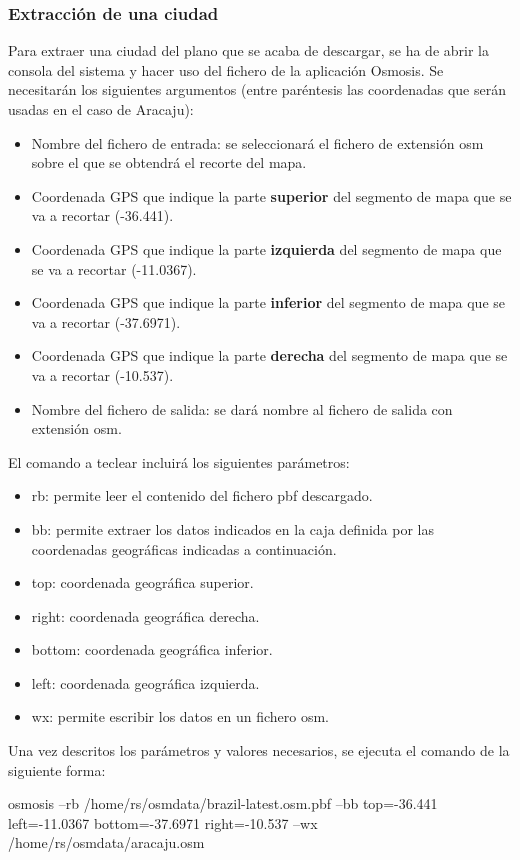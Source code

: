 \subsubsection{Extracción de una ciudad}
Para extraer una ciudad del plano que se acaba de descargar, se ha de abrir la consola del sistema y hacer uso del fichero de la aplicación Osmosis. Se necesitarán los siguientes argumentos (entre paréntesis las coordenadas que serán usadas en el caso de Aracaju):
\begin{itemize}
	\item Nombre del fichero de entrada: se seleccionará el fichero de extensión osm sobre el que se obtendrá el recorte del mapa.
	\item Coordenada GPS que indique la parte \textbf{superior} del segmento de mapa que se va a recortar (-36.441).
	\item Coordenada GPS que indique la parte \textbf{izquierda} del segmento de mapa que se va a recortar (-11.0367).
	\item Coordenada GPS que indique la parte \textbf{inferior} del segmento de mapa que se va a recortar (-37.6971).
	\item Coordenada GPS que indique la parte \textbf{derecha} del segmento de mapa que se va a recortar (-10.537).
	\item Nombre del fichero de salida: se dará nombre al fichero de salida con extensión osm.
\end{itemize}

El comando a teclear incluirá los siguientes parámetros:
\begin{itemize}
	\item rb: permite leer el contenido del fichero pbf descargado.
	\item bb: permite extraer los datos indicados en la caja definida por las coordenadas geográficas indicadas a continuación.
	\item top: coordenada geográfica superior.
	\item right: coordenada geográfica derecha.
	\item bottom: coordenada geográfica inferior.
	\item left: coordenada geográfica izquierda.
	\item wx: permite escribir los datos en un fichero osm.
\end{itemize}

Una vez descritos los parámetros y valores necesarios, se ejecuta el comando de la siguiente forma:

osmosis --rb /home/rs/osmdata/brazil-latest.osm.pbf --bb top=-36.441 left=-11.0367 bottom=-37.6971 right=-10.537 --wx /home/rs/osmdata/aracaju.osm

